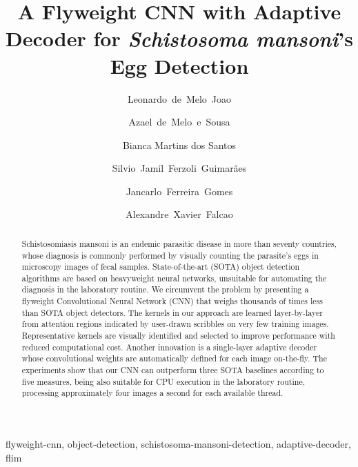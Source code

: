 \documentclass[times,twocolumn,final,authoryear]{elsarticle}
\begin{document}
\begin{frontmatter}

\title{A Flyweight CNN with Adaptive Decoder for \textit{Schistosoma mansoni}'s Egg Detection}

\author[inst1]{Leonardo~de~Melo~Joao}
\author[inst1]{Azael~de~Melo~e~Sousa}
\author[inst2]{Bianca Martins dos Santos}
\author[inst3]{Silvio~Jamil~Ferzoli~Guimarães}
\author[inst2]{Jancarlo~Ferreira~Gomes}
\author[inst1]{Alexandre~Xavier~Falcao}


\begin{abstract}
Schistosomiasis mansoni is an endemic parasitic disease in more than seventy countries, whose diagnosis is commonly performed by visually counting the parasite’s eggs in microscopy images of fecal samples. State-of-the-art (SOTA) object detection algorithms are based on heavyweight neural networks, unsuitable for automating the diagnosis in the laboratory routine. We circumvent the problem by presenting a flyweight Convolutional Neural Network (CNN) that weighs thousands of times less than SOTA object detectors. The kernels in our approach are learned layer-by-layer from attention regions indicated by user-drawn scribbles on very few training images. Representative kernels are visually identified and selected to improve performance with reduced computational cost. Another innovation is a single-layer adaptive decoder whose convolutional weights are automatically defined for each image on-the-fly. The experiments show that our CNN can outperform three SOTA baselines according to five measures, being also suitable for CPU execution in the laboratory routine, processing approximately four images a second for each available thread.
\end{abstract}


    \begin{keyword}
    flyweight-cnn, object-detection, schistosoma-mansoni-detection, adaptive-decoder, flim
    \end{keyword}

\end{frontmatter}
\end{document}
